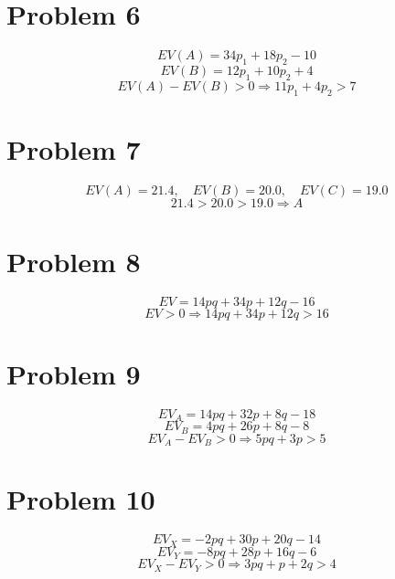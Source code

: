 \section*{Problem 6}
\[
EV(A)=34p_1+18p_2-10
\]
\[
EV(B)=12p_1+10p_2+4
\]
\[
EV(A)-EV(B)>0\Rightarrow 11p_1+4p_2>7
\]

\section*{Problem 7}
\[
EV(A)=21.4,\quad EV(B)=20.0,\quad EV(C)=19.0
\]
\[
21.4>20.0>19.0\Rightarrow A
\]

\section*{Problem 8}
\[
EV=14pq+34p+12q-16
\]
\[
EV>0\Rightarrow 14pq+34p+12q>16
\]

\section*{Problem 9}
\[
EV_A=14pq+32p+8q-18
\]
\[
EV_B=4pq+26p+8q-8
\]
\[
EV_A-EV_B>0\Rightarrow 5pq+3p>5
\]

\section*{Problem 10}
\[
EV_X=-2pq+30p+20q-14
\]
\[
EV_Y=-8pq+28p+16q-6
\]
\[
EV_X-EV_Y>0\Rightarrow 3pq+p+2q>4
\]



